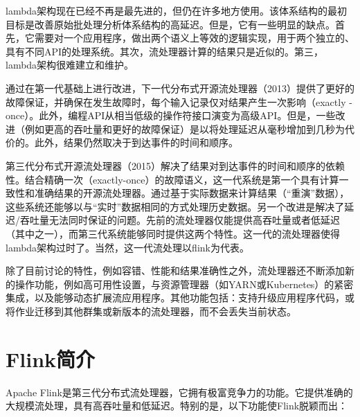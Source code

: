 \documentclass[cn,11pt,chinese]{elegantbook}
\begin{document}
lambda架构现在已经不再是最先进的，但仍在许多地方使用。该体系结构的最初目标是改善原始批处理分析体系结构的高延迟。但是，它有一些明显的缺点。首先，它需要对一个应用程序，做出两个语义上等效的逻辑实现，用于两个独立的、具有不同API的处理系统。其次，流处理器计算的结果只是近似的。第三，lambda架构很难建立和维护。

通过在第一代基础上进行改进，下一代分布式开源流处理器（2013）提供了更好的故障保证，并确保在发生故障时，每个输入记录仅对结果产生一次影响（exactly -once）。此外，编程API从相当低级的操作符接口演变为高级API。但是，一些改进（例如更高的吞吐量和更好的故障保证）是以将处理延迟从毫秒增加到几秒为代价的。此外，结果仍然取决于到达事件的时间和顺序。

第三代分布式开源流处理器（2015）解决了结果对到达事件的时间和顺序的依赖性。结合精确一次（exactly-once）的故障语义，这一代系统是第一个具有计算一致性和准确结果的开源流处理器。通过基于实际数据来计算结果（“重演”数据），这些系统还能够以与“实时”数据相同的方式处理历史数据。另一个改进是解决了延迟/吞吐量无法同时保证的问题。先前的流处理器仅能提供高吞吐量或者低延迟（其中之一），而第三代系统能够同时提供这两个特性。这一代的流处理器使得lambda架构过时了。当然，这一代流处理以flink为代表。

除了目前讨论的特性，例如容错、性能和结果准确性之外，流处理器还不断添加新的操作功能，例如高可用性设置，与资源管理器（如YARN或Kubernetes）的紧密集成，以及能够动态扩展流应用程序。其他功能包括：支持升级应用程序代码，或将作业迁移到其他群集或新版本的流处理器，而不会丢失当前状态。

\section{Flink简介}

Apache Flink是第三代分布式流处理器，它拥有极富竞争力的功能。它提供准确的大规模流处理，具有高吞吐量和低延迟。特别的是，以下功能使Flink脱颖而出：
\end{document}

